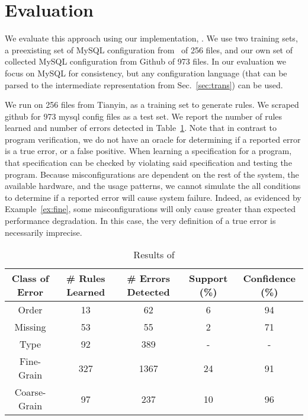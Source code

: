 
\section{Evaluation}

We evaluate this approach using our implementation, \app.
We use two training sets, a preexisting set of MySQL configuration from~\cite{xu15systems} of 256 files,
 and our own set of collected MySQL configuration from Github of 973 files.
In our evaluation we focus on MySQL for consistency, but any configuration language (that can be parsed to the intermediate representation from Sec.~\ref{sec:trans}) can be used.

We run \app on 256 files from Tianyin, as a training set to generate rules.
We scraped github for 973 mysql config files as a test set.
We report the number of rules learned and number of errors detected in Table~\ref{table:learning}.
Note that in contrast to program verification, we do not have an oracle for determining if a reported error is a true error, or a false positive.
When learning a specification for a program, that specification can be checked by violating said specification and testing the program.
Because misconfigurations are dependent on the rest of the system, the available hardware, and the usage patterns, we cannot simulate the all conditions to determine if a reported error will cause system failure.
Indeed, as evidenced by Example~\ref{ex:fine}, some misconfigurations will only cause greater than expected performance degradation.
In this case, the very definition of a true error is necessarily imprecise.

\begin{table}[h]
\centering
\caption{Results of \app}
\label{table:learning}
\setlength{\tabcolsep}{0.5em}
\begin{tabular}{|c|c|c|c|c|}
\hline
{\bf Class of Error } & {\bf \# Rules Learned} & {\bf \# Errors Detected} & {\bf Support (\%)} & {\bf Confidence (\%)}\\ 
\hline
\hline
Order        & 13  & 62   & 6 & 94 \\ 
Missing      & 53  & 55   & 2  & 71 \\ 
Type         & 92  & 389  & -  & -  \\ 
Fine-Grain   & 327 & 1367 & 24 & 91 \\ 
Coarse-Grain & 97  & 237  & 10 & 96\\ 
\hline 
\end{tabular}
\end{table}

